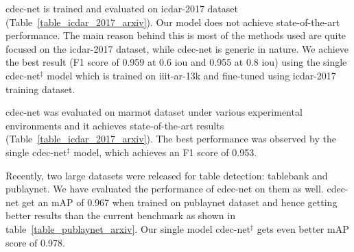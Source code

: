\documentclass[a4paper,conference]{IEEEtran}
\begin{document}
{\sc cd}e{\sc c-n}et is trained and evaluated on {\sc icdar-2017} dataset (Table~\ref{table_icdar_2017_arxiv}). Our model does not achieve state-of-the-art performance. The main reason behind this is most of the methods used are quite focused on the {\sc icdar-2017} dataset, while {\sc cd}e{\sc c-n}et is generic in nature. We achieve the best result (F1 score of 0.959 at 0.6 {\sc i}o{\sc u} and 0.955 at 0.8 {\sc i}o{\sc u}) using the single {\sc cd}e{\sc c-n}et$^{\ddagger}$ model which is trained on {\sc iiit-ar-13k} and fine-tuned using {\sc icdar-2017} training dataset.

{\sc cd}e{\sc c-n}et was evaluated on {\sc m}armot dataset under various experimental environments and it achieves state-of-the-art results (Table~\ref{table_icdar_2017_arxiv}). The best performance was observed by the single {\sc cd}e{\sc c-n}et$^{\ddagger}$ model, which achieves an F1 score of 0.953.

Recently, two large datasets were released for table detection: {\sc t}able{\sc b}ank and {\sc p}ub{\sc l}ay{\sc n}et. We have evaluated the performance of {\sc cd}e{\sc c-n}et on them as well. {\sc cd}e{\sc c-n}et get an mAP of 0.967 when trained on {\sc p}ub{\sc l}ay{\sc n}et dataset and hence getting better results than the current benchmark as shown in table~\ref{table_publaynet_arxiv}. Our single model {\sc cd}e{\sc c-n}et$^{\ddagger}$ gets even better mAP score of 0.978.
\end{document}

